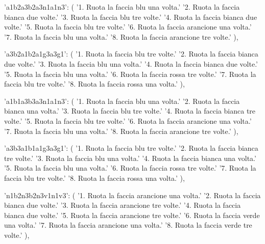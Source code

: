 {{        'a1b2a3b2a3n1a1n3': (
            '1. Ruota la faccia blu una volta.\n'
            '2. Ruota la faccia bianca due volte.\n'
            '3. Ruota la faccia blu tre volte.\n'
            '4. Ruota la faccia bianca due volte.\n'
            '5. Ruota la faccia blu tre volte.\n'
            '6. Ruota la faccia arancione una volta.\n'
            '7. Ruota la faccia blu una volta.\n'
            '8. Ruota la faccia arancione tre volte.'
        ),
        
        'a3b2a1b2a1g3a3g1': (
            '1. Ruota la faccia blu tre volte.\n'
            '2. Ruota la faccia bianca due volte.\n'
            '3. Ruota la faccia blu una volta.\n'
            '4. Ruota la faccia bianca due volte.\n'
            '5. Ruota la faccia blu una volta.\n'
            '6. Ruota la faccia rossa tre volte.\n'
            '7. Ruota la faccia blu tre volte.\n'
            '8. Ruota la faccia rossa una volta.'
        ),
        
        'a1b1a3b3a3n1a1n3': (
            '1. Ruota la faccia blu una volta.\n'
            '2. Ruota la faccia bianca una volta.\n'
            '3. Ruota la faccia blu tre volte.\n'
            '4. Ruota la faccia bianca tre volte.\n'
            '5. Ruota la faccia blu tre volte.\n'
            '6. Ruota la faccia arancione una volta.\n'
            '7. Ruota la faccia blu una volta.\n'
            '8. Ruota la faccia arancione tre volte.'
        ),
        
        'a3b3a1b1a1g3a3g1': (
            '1. Ruota la faccia blu tre volte.\n'
            '2. Ruota la faccia bianca tre volte.\n'
            '3. Ruota la faccia blu una volta.\n'
            '4. Ruota la faccia bianca una volta.\n'
            '5. Ruota la faccia blu una volta.\n'
            '6. Ruota la faccia rossa tre volte.\n'
            '7. Ruota la faccia blu tre volte.\n'
            '8. Ruota la faccia rossa una volta.'
        ),
        
        'n1b2n3b2n3v1n1v3': (
            '1. Ruota la faccia arancione una volta.\n'
            '2. Ruota la faccia bianca due volte.\n'
            '3. Ruota la faccia arancione tre volte.\n'
            '4. Ruota la faccia bianca due volte.\n'
            '5. Ruota la faccia arancione tre volte.\n'
            '6. Ruota la faccia verde una volta.\n'
            '7. Ruota la faccia arancione una volta.\n'
            '8. Ruota la faccia verde tre volte.'
        ),
        
}}
